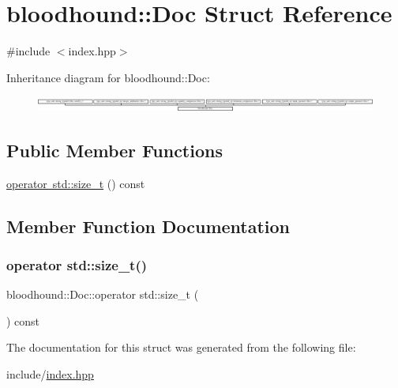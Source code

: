 \hypertarget{structbloodhound_1_1Doc}{}\section{bloodhound\+:\+:Doc Struct Reference}
\label{structbloodhound_1_1Doc}


{\ttfamily \#include $<$index.\+hpp$>$}

Inheritance diagram for bloodhound\+:\+:Doc\+:\begin{figure}[H]
\begin{center}
\leavevmode
\includegraphics[height=0.514233cm]{structbloodhound_1_1Doc}
\end{center}
\end{figure}
\subsection*{Public Member Functions}
\begin{DoxyCompactItemize}
\item 
\mbox{\hyperlink{structbloodhound_1_1Doc_afb469079253eb5b66e0b613f873ae81d}{operator std\+::size\+\_\+t}} () const
\end{DoxyCompactItemize}


\subsection{Member Function Documentation}
\mbox{\label{structbloodhound_1_1Doc_afb469079253eb5b66e0b613f873ae81d}} 
\subsubsection{\texorpdfstring{operator std\+::size\+\_\+t()}{operator std::size\_t()}}
{\footnotesize\ttfamily bloodhound\+::\+Doc\+::operator std\+::size\+\_\+t (\begin{DoxyParamCaption}{ }\end{DoxyParamCaption}) const\hspace{0.3cm}{\ttfamily [inline]}}



The documentation for this struct was generated from the following file\+:\begin{DoxyCompactItemize}
\item 
include/\mbox{\hyperlink{index_8hpp}{index.\+hpp}}\end{DoxyCompactItemize}
